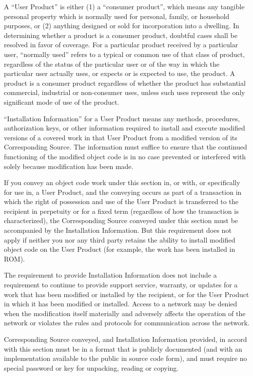 \documentclass[11pt]{article}
\begin{document}
\begin{enumerate}
A ``User Product'' is either (1) a ``consumer product'', which means any
tangible personal property which is normally used for personal, family,
or household purposes, or (2) anything designed or sold for incorporation
into a dwelling.  In determining whether a product is a consumer product,
doubtful cases shall be resolved in favor of coverage.  For a particular
product received by a particular user, ``normally used'' refers to a
typical or common use of that class of product, regardless of the status
of the particular user or of the way in which the particular user
actually uses, or expects or is expected to use, the product.  A product
is a consumer product regardless of whether the product has substantial
commercial, industrial or non-consumer uses, unless such uses represent
the only significant mode of use of the product.

``Installation Information'' for a User Product means any methods,
procedures, authorization keys, or other information required to install
and execute modified versions of a covered work in that User Product from
a modified version of its Corresponding Source.  The information must
suffice to ensure that the continued functioning of the modified object
code is in no case prevented or interfered with solely because
modification has been made.

If you convey an object code work under this section in, or with, or
specifically for use in, a User Product, and the conveying occurs as
part of a transaction in which the right of possession and use of the
User Product is transferred to the recipient in perpetuity or for a
fixed term (regardless of how the transaction is characterized), the
Corresponding Source conveyed under this section must be accompanied
by the Installation Information.  But this requirement does not apply
if neither you nor any third party retains the ability to install
modified object code on the User Product (for example, the work has
been installed in ROM).

The requirement to provide Installation Information does not include a
requirement to continue to provide support service, warranty, or updates
for a work that has been modified or installed by the recipient, or for
the User Product in which it has been modified or installed.  Access to a
network may be denied when the modification itself materially and
adversely affects the operation of the network or violates the rules and
protocols for communication across the network.

Corresponding Source conveyed, and Installation Information provided,
in accord with this section must be in a format that is publicly
documented (and with an implementation available to the public in
source code form), and must require no special password or key for
unpacking, reading or copying.


\end{enumerate}
\end{document}
